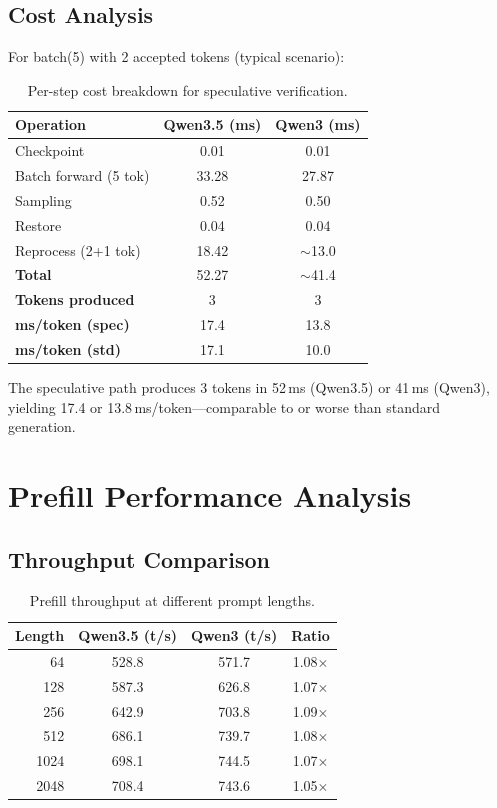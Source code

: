 \documentclass[11pt,a4paper]{article}
\begin{document}
\subsection{Cost Analysis}

For batch(5) with 2 accepted tokens (typical scenario):

\begin{table}[H]
\centering
\caption{Per-step cost breakdown for speculative verification.}
\label{tab:cost}
\begin{tabular}{lcc}
\toprule
\textbf{Operation} & \textbf{Qwen3.5 (ms)} & \textbf{Qwen3 (ms)} \\
\midrule
Checkpoint & 0.01 & 0.01 \\
Batch forward (5 tok) & 33.28 & 27.87 \\
Sampling & 0.52 & 0.50 \\
Restore & 0.04 & 0.04 \\
Reprocess (2+1 tok) & 18.42 & $\sim$13.0 \\
\midrule
\textbf{Total} & 52.27 & $\sim$41.4 \\
\textbf{Tokens produced} & 3 & 3 \\
\textbf{ms/token (spec)} & 17.4 & 13.8 \\
\textbf{ms/token (std)} & 17.1 & 10.0 \\
\bottomrule
\end{tabular}
\end{table}

The speculative path produces 3 tokens in 52\,ms (Qwen3.5) or 41\,ms (Qwen3), yielding 17.4 or 13.8\,ms/token---comparable to or worse than standard generation.

\section{Prefill Performance Analysis}

\subsection{Throughput Comparison}

\begin{table}[H]
\centering
\caption{Prefill throughput at different prompt lengths.}
\label{tab:prefill}
\begin{tabular}{rccc}
\toprule
\textbf{Length} & \textbf{Qwen3.5 (t/s)} & \textbf{Qwen3 (t/s)} & \textbf{Ratio} \\
\midrule
64 & 528.8 & 571.7 & 1.08$\times$ \\
128 & 587.3 & 626.8 & 1.07$\times$ \\
256 & 642.9 & 703.8 & 1.09$\times$ \\
512 & 686.1 & 739.7 & 1.08$\times$ \\
1024 & 698.1 & 744.5 & 1.07$\times$ \\
2048 & 708.4 & 743.6 & 1.05$\times$ \\
\bottomrule
\end{tabular}
\end{table}
\end{document}
